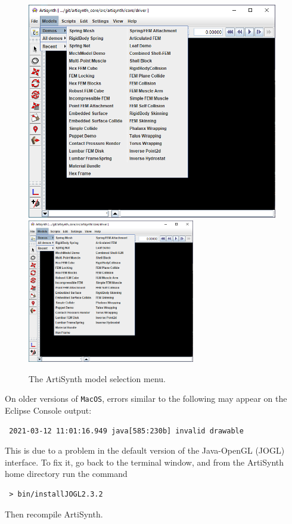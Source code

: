 \begin{figure}[ht]
\begin{center}
\iflatexml
   \includegraphics[]{images/ArtiSynthDemoMenu}
\else
   \includegraphics[width=0.65\textwidth]{images/ArtiSynthDemoMenu}
\fi
\end{center}
\caption{The ArtiSynth model selection menu.}
\label{ModelSelectionMenu:fig}
\end{figure}

\iflatexml\else\pagebreak\fi

\ifMacOS
\begin{sideblock}
On older versions of {\tt MacOS}, errors similar to the following
may appear on the Eclipse Console output:
\begin{verbatim}
 2021-03-12 11:01:16.949 java[585:230b] invalid drawable 
\end{verbatim}
This is due to a problem in the default version of the Java-OpenGL
(JOGL) interface. To fix it, go back to the terminal window, and
from the ArtiSynth home directory run the command
\begin{verbatim}
 > bin/installJOGL2.3.2
\end{verbatim}
Then recompile ArtiSynth.
\end{sideblock}
\fi


